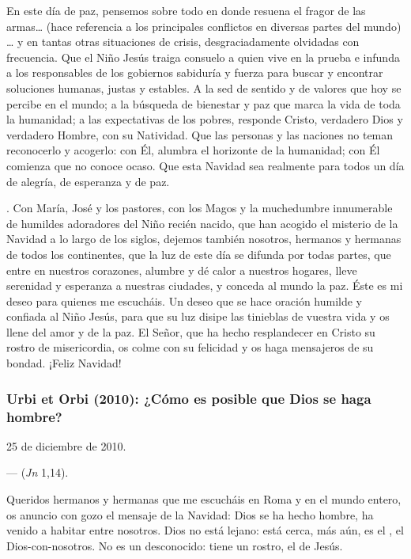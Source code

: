 En este día de paz, pensemos sobre todo en donde resuena el fragor de las armas\ldots{} (hace referencia a los principales conflictos en diversas partes del mundo) \ldots{} y en tantas otras situaciones de crisis, desgraciadamente olvidadas con frecuencia. Que el Niño Jesús traiga consuelo a quien vive en la prueba e infunda a los responsables de los gobiernos sabiduría y fuerza para buscar y encontrar soluciones humanas, justas y estables. A la sed de sentido y de valores que hoy se percibe en el mundo; a la búsqueda de bienestar y paz que marca la vida de toda la humanidad; a las expectativas de los pobres, responde Cristo, verdadero Dios y verdadero Hombre, con su Natividad. Que las personas y las naciones no teman reconocerlo y acogerlo: con Él,  alumbra el horizonte de la humanidad; con Él comienza  que no conoce ocaso. Que esta Navidad sea realmente para todos un día de alegría, de esperanza y de paz.

\emph{}. Con María, José y los pastores, con los Magos y la muchedumbre innumerable de humildes adoradores del Niño recién nacido, que han acogido el misterio de la Navidad a lo largo de los siglos, dejemos también nosotros, hermanos y hermanas de todos los continentes, que la luz de este día se difunda por todas partes, que entre en nuestros corazones, alumbre y dé calor a nuestros hogares, lleve serenidad y esperanza a nuestras ciudades, y conceda al mundo la paz. Éste es mi deseo para quienes me escucháis. Un deseo que se hace oración humilde y confiada al Niño Jesús, para que su luz disipe las tinieblas de vuestra vida y os llene del amor y de la paz. El Señor, que ha hecho resplandecer en Cristo su rostro de misericordia, os colme con su felicidad y os haga mensajeros de su bondad. ¡Feliz Navidad!

\subsubsection{Urbi et Orbi (2010): ¿Cómo es posible que Dios se haga hombre?}

25 de diciembre de 2010.

 ---  (\emph{Jn} 1,14).

Queridos hermanos y hermanas que me escucháis en Roma y en el mundo entero, os anuncio con gozo el mensaje de la Navidad: Dios se ha hecho hombre, ha venido a habitar entre nosotros. Dios no está lejano: está cerca, más aún, es el , el Dios-con-nosotros. No es un desconocido: tiene un rostro, el de Jesús.

